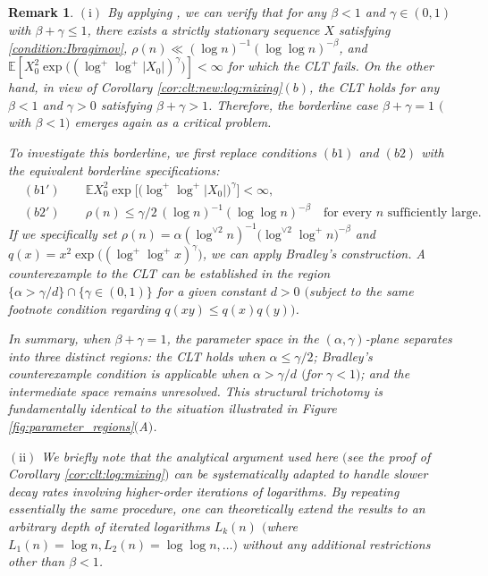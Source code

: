 \documentclass[11pt,a4,leqno]{amsart}
\newtheorem{remark}[lemma]{Remark}
\newcommand{\E }{{\mathbb E}}
\newcommand{\1}{{\mathbf 1}}
\begin{document}
\begin{remark}
\noindent $(\mathrm{i})$ By applying \cite[Theorem 1]{bradley:1980}, we can verify that for any $\beta<1$ and $\gamma\in(0,1)$ with 
$\beta+\gamma \le 1$, there exists a strictly stationary sequence $X$ satisfying \eqref{condition:Ibragimov}, 
$\rho (n) \ll (\log n)^{-1} (\log \log n)^{-\beta}$, and $\E [X_0^2 \exp \big( ( \log^+\log^+ |X_0|)^\gamma \big)] <\infty$ 
for which the CLT fails. On the other hand, in view of Corollary \ref{cor:clt:new:log:mixing}$(b)$, the CLT holds for 
any $\beta<1$ and $\gamma>0$ satisfying $\beta+\gamma>1$. Therefore, the borderline case $\beta+\gamma=1$ $($with $\beta<1$$)$ 
emerges again as a critical problem.

To investigate this borderline, we first replace conditions $(b1)$ and $(b2)$ with the equivalent borderline specifications:
\begin{align*}
& (b1') \qquad  \E X_0^2 \exp\Big[\big(\log^+ \log^+ |X_0|\big)^{\gamma}
\Big] <\infty, \\
& (b2') \qquad  \rho(n) \le \gamma/2\, (\log n)^{-1}(\log \log n)^{-\beta} \quad \text{for every $n$ sufficiently large}.
\end{align*}
If we specifically set $\rho(n)=\alpha (\log^{\vee 2}n)^{-1} \big(\log^{\vee 2}\log^{+} n \big)^{-\beta}$ and 
$q(x)= x^2 \exp\big((\log^+\log^+ x)^\gamma \big)$, we can apply Bradley's construction. A counterexample to 
the CLT can be established in the region $\{\alpha > \gamma / d\} \cap \{\gamma\in (0,1)\}$ for a given 
constant $d>0$ $($subject to the same footnote condition regarding $q(xy)\le q(x)q(y)$$)$.

In summary, when $\beta+\gamma=1$, the parameter space in the $(\alpha,\gamma)$-plane separates into three distinct regions: 
the CLT holds when $\alpha \le \gamma/2$; Bradley's counterexample condition is applicable when $\alpha > \gamma/d$ $($for $\gamma<1$$)$; 
and the intermediate space remains unresolved. This structural trichotomy is fundamentally identical to the situation illustrated 
in Figure \ref{fig:parameter_regions}$($A$)$. 

\vspace{2mm}
\noindent$(\mathrm{ii})$
We briefly note that the analytical argument used here $($see the proof of Corollary \ref{cor:clt:log:mixing}$)$ 
can be systematically adapted to handle slower decay rates involving higher-order iterations of logarithms. 
By repeating essentially the same procedure, one can theoretically extend the results to an arbitrary 
depth of iterated logarithms $L_k(n)$ $($where $L_1(n) = \log n, L_2(n) = \log \log n, \dots$$)$ 
without any additional restrictions other than $\beta<1$.
\end{remark}
\end{document}
